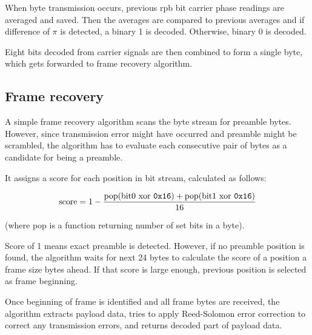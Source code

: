 When byte transmission occurs, previous rpb bit carrier phase readings are averaged and saved. Then the averages are compared to previous averages and if difference of $\pi$ is detected, a binary 1 is decoded. Otherwise, binary 0 is decoded.

Eight bits decoded from carrier signals are then combined to form a single byte, which gets forwarded to frame recovery algorithm.

\subsection{Frame recovery}
\label{sec:frame-recovery}

A simple frame recovery algorithm scans the byte stream for preamble bytes.
However, since transmission error might have occurred and preamble might be scrambled, the algorithm has to evaluate each consecutive pair of bytes as a candidate for being a preamble.

It assigns a score for each position in bit stream, calculated as follows:

\begin{equation}
\textrm{score} = 1 - \frac{\textrm{pop(bit0 xor \texttt{0x16})} + \textrm{pop(bit1 xor \texttt{0x16})}}{16}
\end{equation}

(where pop is a function returning number of set bits in a byte).

Score of 1 means exact preamble is detected. However, if no preamble position is found, the algorithm waits for next 24 bytes to calculate the score of a position a frame size bytes ahead. If that score is large enough, previous position is selected as frame beginning.

Once beginning of frame is identified and all frame bytes are received, the algorithm extracts payload data, tries to apply Reed-Solomon error correction to correct any transmission errors, and returns decoded part of payload data.
